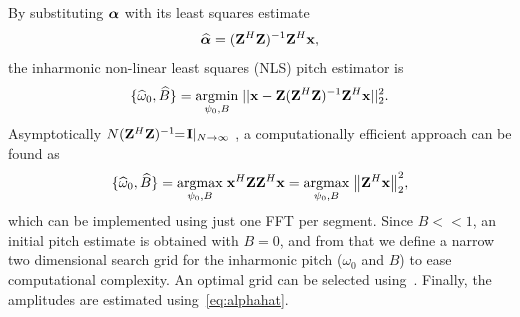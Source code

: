 \documentclass{article}
\begin{document}
By substituting $\text{\boldmath$\alpha$}$ with its least squares estimate
\begin{equation}\label{eq:alphahat}
  \text{\boldmath${\widehat\alpha}$} = (\mathbf{Z}^H\mathbf{Z})^{-1}\mathbf{Z}^H\mathbf x,
\end{equation}
the inharmonic non-linear least squares (NLS) pitch estimator is
\begin{equation}\label{eq:psi_B_est}
  \{ \widehat\omega_0, \widehat B \}= \underset{\psi_0, B}{\operatorname{argmin}}\;{|| \mathbf x - \mathbf{Z}(\mathbf{Z}^H\mathbf{Z})^{-1}\mathbf{Z}^H\mathbf x}||_2^2.
\end{equation}
Asymptotically $N(\mathbf{Z}^H\mathbf{Z})^{-1}\!\!=\!\mathbf{I}|_{N\to\infty}$ , a computationally efficient approach can be found as
\begin{equation} \label{eq:ANLS}
    \{\widehat\omega_0, \widehat B \} = \underset{\psi_0,B}{\operatorname{argmax}}\;{\mathbf x^H \mathbf{Z} \mathbf{Z}^H \mathbf x} = \underset{\psi_0,B}{\operatorname{argmax}}\;{ \left\lVert\mathbf{Z}^H\mathbf x\right\rVert_2^2},
\end{equation}
which can be implemented using just one FFT per segment. Since $B\!<\!<\!1$, an initial pitch estimate is obtained with $B=0$, and from that we define a narrow two dimensional search grid for the inharmonic pitch ($\omega_0$ and $B$) to ease computational complexity. An optimal grid can be selected using~\cite{jkn:grid_size}. Finally, the amplitudes are estimated using~\eqref{eq:alphahat}.
%
%
%
%
%
%
\end{document}
